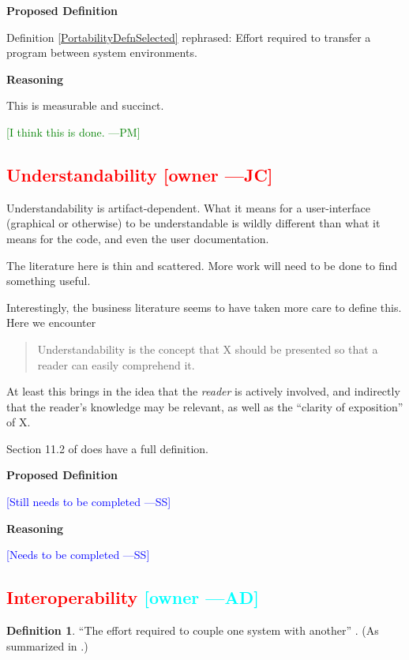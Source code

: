 \documentclass[letterpaper,cleveref]{lipics-v2019}
\newcommand{\authornote}[3]{\textcolor{#1}{[#3 ---#2]}}
\newcommand{\authornote}[3]{}
\newcommand{\wss}[1]{\authornote{blue}{SS}{#1}} %
\newcommand{\jc}[1]{\authornote{red}{JC}{#1}} %
\newcommand{\pmi}[1]{\authornote{green}{PM}{#1}} %
\newcommand{\ad}[1]{\authornote{cyan}{AD}{#1}} %
\newcommand{\notdone}[1]{\textcolor{red}{#1}}
\theoremstyle{definition}
\newtheorem{defn}{Definition}
\begin{document}
\noindent \textbf{Proposed Definition}

Definition \ref{PortabilityDefnSelected} rephrased: Effort required to transfer
a program between system environments.

\noindent \textbf{Reasoning}

This is measurable and succinct. 

\pmi{I think this is done.}

\subsection{\notdone{Understandability} \jc{owner}}

Understandability is artifact-dependent. What it means for a user-interface (graphical
or otherwise) to be understandable is wildly different than what it means for the code,
and even the user documentation.

The literature here is thin and scattered.  More work will need to be done to find
something useful.

Interestingly, the business literature seems to have taken more care to define this.
Here we encounter
\begin{quote}
Understandability is the concept that X should be presented
so that a reader can easily comprehend it.
\end{quote}
At least this brings in the idea that the \emph{reader} is actively involved, and
indirectly that the reader's knowledge may be relevant, as well as the
``clarity of exposition'' of X.

Section 11.2 of \citet{adams2015nonfunctional} does have a full definition.

\noindent \textbf{Proposed Definition}

\wss{Still needs to be completed}

\noindent \textbf{Reasoning}

\wss{Needs to be completed}

\subsection{\notdone{Interoperability} \ad{owner}}

\begin{defn}
  ``The effort required to couple one system with another''
  \citep{McCallEtAl1977}. (As summarized in \citet{VanVliet2000}.)
\end{defn}
\end{document}
